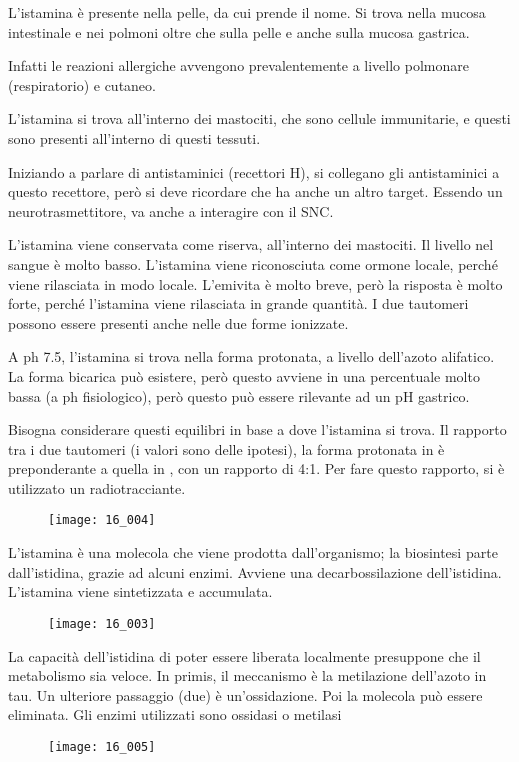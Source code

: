L'istamina è presente nella pelle, da cui prende il nome. Si trova nella
mucosa intestinale e nei polmoni oltre che sulla pelle e anche sulla mucosa
gastrica.

Infatti le reazioni allergiche avvengono prevalentemente a livello
polmonare (respiratorio) e cutaneo.

L'istamina si trova all'interno dei mastociti, che sono cellule
immunitarie, e questi sono presenti all'interno di questi tessuti.

Iniziando a parlare di antistaminici (recettori H), si collegano gli
antistaminici a questo recettore, però si deve ricordare che ha anche un
altro target. Essendo un neurotrasmettitore, va anche a interagire con
il SNC.

L'istamina viene conservata come riserva, all'interno dei mastociti. Il
livello nel sangue è molto basso.
L'istamina viene riconosciuta come ormone locale, perché viene
rilasciata in modo locale. L'emivita è molto breve, però la risposta è
molto forte, perché l'istamina viene rilasciata in grande quantità.
I due tautomeri possono essere presenti anche nelle due forme ionizzate.

A ph 7.5, l'istamina si trova nella forma protonata, a livello dell'azoto alifatico.
La forma bicarica può esistere, però questo avviene in una percentuale
molto bassa (a ph fisiologico), però questo può essere rilevante ad un
pH gastrico.

Bisogna considerare questi equilibri in base a dove l'istamina si trova.
Il rapporto tra i due tautomeri (i valori sono delle ipotesi), la forma
protonata in \tau{} è preponderante a quella in \pi, con un rapporto di 4:1.
Per fare questo rapporto, si è utilizzato un radiotracciante.

\clearpage

\begin{figure}[H]
  \centering
  \texttt{[image: 16\_004]}
\end{figure}


L'istamina è una molecola che viene prodotta dall'organismo; la
biosintesi parte dall'istidina, grazie ad alcuni enzimi. Avviene una
decarbossilazione dell'istidina.
L'istamina viene sintetizzata e accumulata.
\begin{figure}[H]
  \centering
  \texttt{[image: 16\_003]}
\end{figure}


La capacità dell'istidina di poter essere liberata localmente presuppone
che il metabolismo sia veloce.
In primis, il meccanismo è la metilazione dell'azoto in tau.
Un ulteriore passaggio (due) è un'ossidazione.
Poi la molecola può essere eliminata.
Gli enzimi utilizzati sono ossidasi o metilasi
\begin{figure}[H]
  \centering
  \texttt{[image: 16\_005]}
\end{figure}

